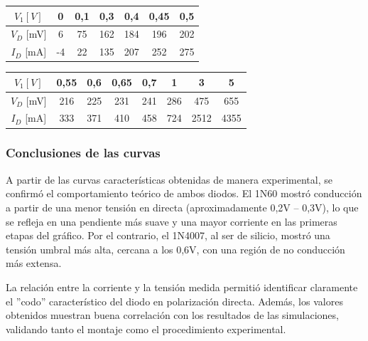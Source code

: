 
\begin{center}
    \renewcommand{\arraystretch}{1.25}
    \begin{tabular}{|c|c|c|c|c|c|c|}
    \hline
    \rowcolor[HTML]{FFFFC7} 
    $V_1 [V]$                              & 0  & 0,1 & 0,3 & 0,4 & 0,45 & 0,5 \\ \hline
    \cellcolor[HTML]{FFFC9E}$V_D$ {[}mV{]} & 6  & 75  & 162 & 184 & 196  & 202 \\ \hline
    \cellcolor[HTML]{FFCE93}$I_D$ {[}mA{]} & -4 & 22  & 135 & 207 & 252  & 275 \\ \hline
    \end{tabular}
    \par\vspace{10pt}\par
    \small
    \begin{tabular}{|c|c|lc|c|c|c|c|}
    \hline
    \rowcolor[HTML]{FFFFC7} 
    $V_1 [V]$                              & 0,55 & \multicolumn{1}{l|}{\cellcolor[HTML]{FFFFC7}0,6} & 0,65 & 0,7 & 1   & 3    & 5    \\ \hline
    \cellcolor[HTML]{FFFC9E}$V_D$ {[}mV{]} & 216  & 225                                              & 231  & 241 & 286 & 475  & 655  \\ \hline
    \cellcolor[HTML]{FFCE93}$I_D$ {[}mA{]} & 333  & 371                                              & 410  & 458 & 724 & 2512 & 4355 \\ \hline
    \end{tabular}
\end{center}

\subsubsection{Conclusiones de las curvas}
\sangria{} A partir de las curvas características obtenidas de manera experimental, se confirmó el comportamiento teórico de ambos diodos. El 1N60 mostró conducción a partir de una menor tensión en directa (aproximadamente 0,2V – 0,3V), lo que se refleja en una pendiente más suave y una mayor corriente en las primeras etapas del gráfico. Por el contrario, el 1N4007, al ser de silicio, mostró una tensión umbral más alta, cercana a los 0,6V, con una región de no conducción más extensa.

\sangria{} La relación entre la corriente y la tensión medida permitió identificar claramente el ''codo'' característico del diodo en polarización directa. Además, los valores obtenidos muestran buena correlación con los resultados de las simulaciones, validando tanto el montaje como el procedimiento experimental.

